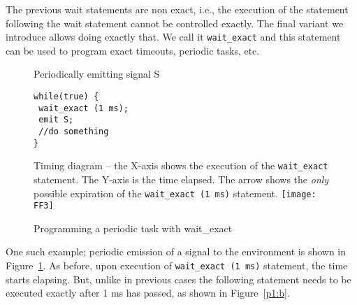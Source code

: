 The previous wait statements are non exact, i.e., the 
execution of the statement following the wait statement cannot be
controlled exactly. The final variant we introduce allows doing exactly
that. We call it \texttt{wait\_exact} and this statement can be used to
program exact timeouts, periodic tasks, etc.

\begin{figure}[t!]
  \centering
	\vspace{-10pt}
        \begin{SubFloat}{\label{pp:a}Periodically emitting signal S}
        \begin{lstlisting}[style=sysj,morekeywords={emit,trap,pause,exit,wait_exact}]
while(true) { 
 wait_exact (1 ms); 
 emit S; 
 //do something 
}
\end{lstlisting}
\end{SubFloat}

\begin{SubFloat}{\label{p1:b}Timing diagram -- the X-axis shows the
    execution of the \texttt{wait\_exact} statement. The Y-axis is the
    time elapsed. The arrow shows the \textit{only} possible expiration
    of the \texttt{wait\_exact (1 ms)} statement.}
  \texttt{[image: FF3]}
\end{SubFloat}
  \caption{Programming a periodic task with wait\_exact}
  \label{fig:p1}
  \vspace{-10pt}
\end{figure}

One such example; periodic emission of a signal to the environment is
shown in Figure~\ref{fig:p1}. As before, upon execution of
\texttt{wait\_exact (1 ms)} statement, the time starts elapsing. But,
unlike in previous cases the following statement needs to be executed
exactly after 1 ms has passed, as shown in Figure~\ref{p1:b}.


